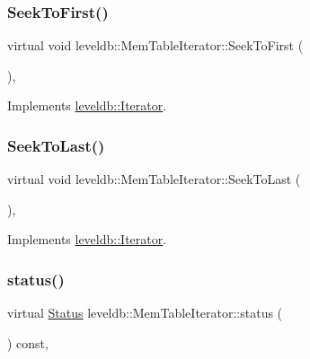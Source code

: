 \subsubsection{\texorpdfstring{SeekToFirst()}{SeekToFirst()}}
{\footnotesize\ttfamily virtual void leveldb\+::\+Mem\+Table\+Iterator\+::\+Seek\+To\+First (\begin{DoxyParamCaption}{ }\end{DoxyParamCaption})\hspace{0.3cm}{\ttfamily [inline]}, {\ttfamily [virtual]}}



Implements \mbox{\hyperlink{classleveldb_1_1_iterator_a3594967cf26ddf1d37c7b886bb48627e}{leveldb\+::\+Iterator}}.

\mbox{\label{classleveldb_1_1_mem_table_iterator_aaed044dc887a51c924086f2a2844a5f0}} 
\subsubsection{\texorpdfstring{SeekToLast()}{SeekToLast()}}
{\footnotesize\ttfamily virtual void leveldb\+::\+Mem\+Table\+Iterator\+::\+Seek\+To\+Last (\begin{DoxyParamCaption}{ }\end{DoxyParamCaption})\hspace{0.3cm}{\ttfamily [inline]}, {\ttfamily [virtual]}}



Implements \mbox{\hyperlink{classleveldb_1_1_iterator_a8ad637f0a759e6d94cca6c5b4db440d3}{leveldb\+::\+Iterator}}.

\mbox{\label{classleveldb_1_1_mem_table_iterator_af9bc5f041cd319cfb44408d6bf5aa4a2}} 
\subsubsection{\texorpdfstring{status()}{status()}}
{\footnotesize\ttfamily virtual \mbox{\hyperlink{classleveldb_1_1_status}{Status}} leveldb\+::\+Mem\+Table\+Iterator\+::status (\begin{DoxyParamCaption}{ }\end{DoxyParamCaption}) const\hspace{0.3cm}{\ttfamily [inline]}, {\ttfamily [virtual]}}



